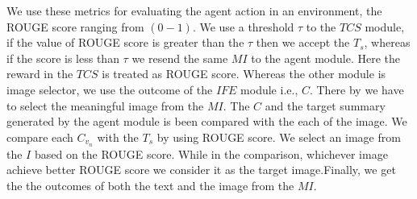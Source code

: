 \documentclass[preprint,review,12pt]{elsarticle}
\begin{document}
We use these metrics for evaluating the agent action in an environment, the ROUGE score ranging from $(0-1)$. We use a threshold $\tau$ to the $TCS$ module, if the value of  ROUGE score is greater than the $\tau$ then we accept the $T_s$, whereas if the score is less than $\tau$ we resend the same $MI$ to the agent module. Here  the reward in the $TCS$ is treated as ROUGE score. Whereas the other module is image selector, we use the outcome of the $IFE$ module i.e., $C$. There by we have to select the meaningful image from the $MI$. The $C$ and the target summary generated by the agent module is been compared with the each of the image. We compare each $C_{{v}_n}$ with the $T_s$ by using ROUGE score. We select an image from the $I$ based on the ROUGE score. While in the comparison, whichever image achieve better ROUGE score we consider it as the target image.Finally, we get the the outcomes of both the text and the image from the $MI$.
\end{document}
